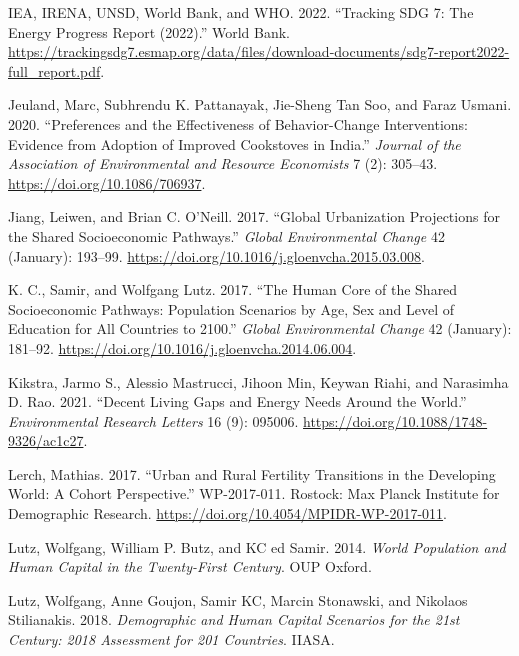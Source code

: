 \documentclass[
]{article}
\newlength{\cslhangindent}
\newlength{\cslentryspacingunit} %
\newenvironment{CSLReferences}[2] %
 {%
  \setlength{\parindent}{0pt}
  \ifodd #1
  \let\oldpar\par
  \def\par{\hangindent=\cslhangindent\oldpar}
  \fi
  \setlength{\parskip}{#2\cslentryspacingunit}
 }%
 {}
\begin{document}
\begin{CSLReferences}{1}{0}
\leavevmode{}%
IEA, IRENA, UNSD, World Bank, and WHO. 2022. {``Tracking {SDG} 7: {The} {Energy} {Progress} {Report} (2022).''} World Bank. \url{https://trackingsdg7.esmap.org/data/files/download-documents/sdg7-report2022-full_report.pdf}.

\leavevmode{}%
Jeuland, Marc, Subhrendu K. Pattanayak, Jie-Sheng Tan Soo, and Faraz Usmani. 2020. {``Preferences and the {Effectiveness} of {Behavior}-{Change} {Interventions}: {Evidence} from {Adoption} of {Improved} {Cookstoves} in {India}.''} \emph{Journal of the Association of Environmental and Resource Economists} 7 (2): 305--43. \url{https://doi.org/10.1086/706937}.

\leavevmode{}%
Jiang, Leiwen, and Brian C. O'Neill. 2017. {``Global Urbanization Projections for the {Shared} {Socioeconomic} {Pathways}.''} \emph{Global Environmental Change} 42 (January): 193--99. \url{https://doi.org/10.1016/j.gloenvcha.2015.03.008}.

\leavevmode{}%
K. C., Samir, and Wolfgang Lutz. 2017. {``The Human Core of the Shared Socioeconomic Pathways: {Population} Scenarios by Age, Sex and Level of Education for All Countries to 2100.''} \emph{Global Environmental Change} 42 (January): 181--92. \url{https://doi.org/10.1016/j.gloenvcha.2014.06.004}.

\leavevmode{}%
Kikstra, Jarmo S., Alessio Mastrucci, Jihoon Min, Keywan Riahi, and Narasimha D. Rao. 2021. {``Decent Living Gaps and Energy Needs Around the World.''} \emph{Environmental Research Letters} 16 (9): 095006. \url{https://doi.org/10.1088/1748-9326/ac1c27}.

\leavevmode{}%
Lerch, Mathias. 2017. {``Urban and Rural Fertility Transitions in the Developing World: A Cohort Perspective.''} WP-2017-011. Rostock: Max Planck Institute for Demographic Research. \url{https://doi.org/10.4054/MPIDR-WP-2017-011}.

\leavevmode{}%
Lutz, Wolfgang, William P. Butz, and KC ed Samir. 2014. \emph{World Population and Human Capital in the Twenty-First Century}. OUP Oxford.

\leavevmode{}%
Lutz, Wolfgang, Anne Goujon, Samir KC, Marcin Stonawski, and Nikolaos Stilianakis. 2018. \emph{Demographic and Human Capital Scenarios for the 21st Century: 2018 Assessment for 201 Countries}. IIASA.


\end{CSLReferences}
\end{document}
